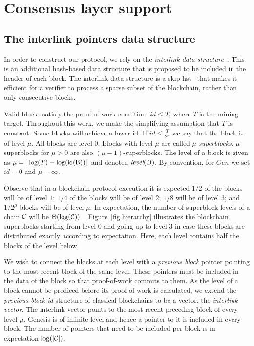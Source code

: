 \section{Consensus layer support} \label{sec:consensus}

\subsection{The interlink pointers data structure}
\label{sec:interlink}

In order to construct our protocol, we rely on the \emph{interlink data
structure}~\cite{KLS}. This is an additional hash-based data
structure that is proposed to be included in the header of each block. The
interlink data structure is a skip-list~\cite{skiplist} that makes it efficient
for a verifier to process a sparse subset of the blockchain, rather than only
consecutive blocks.

Valid blocks satisfy the proof-of-work condition: $id \leq T$, where $T$ is the
mining target. Throughout this work, we make the simplifying assumption that $T$
is constant. Some blocks will achieve a lower id. If $id \leq
\frac{T}{2^\mu}$ we say that the block is of level $\mu$. All blocks are level
$0$. Blocks with level $\mu$ are called $\mu$-\emph{superblocks}.
$\mu$-superblocks for $\mu > 0$ are also $(\mu - 1)$-superblocks. The level of a
block is given as $\mu = \left \lfloor \log(T) - \log(\sf{id}(B)) \right
\rfloor$ and denoted $\emph{level}(B)$. By convention, for $Gen$ we set $id =
0$ and $\mu = \infty$.

Observe that in a blockchain protocol execution it is expected $1/2$ of the
blocks will be of level $1$; $1/4$ of the blocks will be of level $2$; $1/8$
will be of level $3$; and $1/2^\mu$ blocks will be of level $\mu$. In
expectation, the number of superblock levels of a chain $\mathcal{C}$ will be
$\Theta(\log(\mathcal{C}))$~\cite{KLS}. Figure~\ref{fig.hierarchy} illustrates the
blockchain superblocks starting from level $0$ and going up to level $3$ in case
these blocks are distributed exactly according to expectation. Here, each level
contains half the blocks of the level below.

We wish to connect the blocks at each level with a \emph{previous block}
pointer pointing to the most recent block of the same level. These pointers must
be included in the data of the block so that proof-of-work commits to them. As
the level of a block cannot be prediced before its proof-of-work is calculated,
we extend the \emph{previous block id} structure of classical blockchains to be
a vector, the \emph{interlink vector}. The interlink vector points to the most
recent preceding block of every level $\mu$. Genesis is of infinite level and
hence a pointer to it is included in every block. The number of pointers that
need to be included per block is in expectation $\log(|\mathcal{C}|)$.

